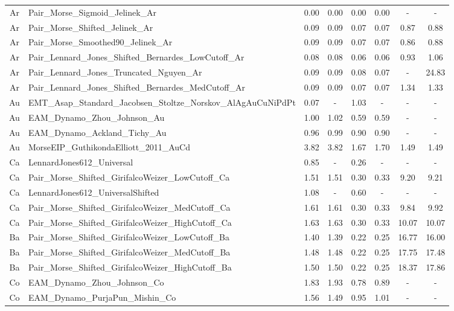 \documentclass[%
 reprint,
 amsmath,amssymb,
 aps,
]{revtex4-1}
\begin{document}
\begin{longtable*}{@{\extracolsep{\fill}} c l c c c c c c}
 Ar & Pair\_Morse\_Sigmoid\_Jelinek\_Ar & 0.00 & 0.00 & 0.00 & 0.00 & - & - \\
 Ar & Pair\_Morse\_Shifted\_Jelinek\_Ar & 0.09 & 0.09 & 0.07 & 0.07 & 0.87 & 0.88 \\
 Ar & Pair\_Morse\_Smoothed90\_Jelinek\_Ar & 0.09 & 0.09 & 0.07 & 0.07 & 0.86 & 0.88 \\
 Ar & Pair\_Lennard\_Jones\_Shifted\_Bernardes\_LowCutoff\_Ar & 0.08 & 0.08 & 0.06 & 0.06 & 0.93 & 1.06 \\
 Ar & Pair\_Lennard\_Jones\_Truncated\_Nguyen\_Ar & 0.09 & 0.09 & 0.08 & 0.07 & - & 24.83 \\
 Ar & Pair\_Lennard\_Jones\_Shifted\_Bernardes\_MedCutoff\_Ar & 0.09 & 0.09 & 0.07 & 0.07 & 1.34 & 1.33 \\
 Au & EMT\_Asap\_Standard\_Jacobsen\_Stoltze\_Norskov\_AlAgAuCuNiPdPt & 0.07 & - & 1.03 & - & - & - \\
 Au & EAM\_Dynamo\_Zhou\_Johnson\_Au & 1.00 & 1.02 & 0.59 & 0.59 & - & - \\
 Au & EAM\_Dynamo\_Ackland\_Tichy\_Au & 0.96 & 0.99 & 0.90 & 0.90 & - & - \\
 Au & MorseEIP\_GuthikondaElliott\_2011\_AuCd & 3.82 & 3.82 & 1.67 & 1.70 & 1.49 & 1.49 \\
 Ca & LennardJones612\_Universal & 0.85 & - & 0.26 & - & - & - \\
 Ca & Pair\_Morse\_Shifted\_GirifalcoWeizer\_LowCutoff\_Ca & 1.51 & 1.51 & 0.30 & 0.33 & 9.20 & 9.21 \\
 Ca & LennardJones612\_UniversalShifted & 1.08 & - & 0.60 & - & - & - \\
 Ca & Pair\_Morse\_Shifted\_GirifalcoWeizer\_MedCutoff\_Ca & 1.61 & 1.61 & 0.30 & 0.33 & 9.84 & 9.92 \\
 Ca & Pair\_Morse\_Shifted\_GirifalcoWeizer\_HighCutoff\_Ca & 1.63 & 1.63 & 0.30 & 0.33 & 10.07 & 10.07 \\
 Ba & Pair\_Morse\_Shifted\_GirifalcoWeizer\_LowCutoff\_Ba & 1.40 & 1.39 & 0.22 & 0.25 & 16.77 & 16.00 \\
 Ba & Pair\_Morse\_Shifted\_GirifalcoWeizer\_MedCutoff\_Ba & 1.48 & 1.48 & 0.22 & 0.25 & 17.75 & 17.48 \\
 Ba & Pair\_Morse\_Shifted\_GirifalcoWeizer\_HighCutoff\_Ba & 1.50 & 1.50 & 0.22 & 0.25 & 18.37 & 17.86 \\
 Co & EAM\_Dynamo\_Zhou\_Johnson\_Co & 1.83 & 1.93 & 0.78 & 0.89 & - & - \\
 Co & EAM\_Dynamo\_PurjaPun\_Mishin\_Co & 1.56 & 1.49 & 0.95 & 1.01 & - & - \\

\end{longtable*}
\end{document}
